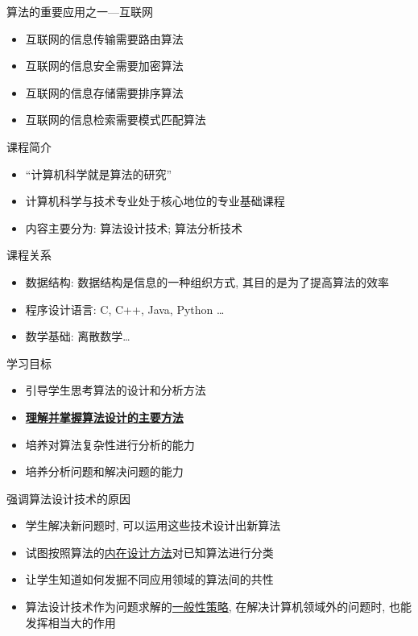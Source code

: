 \documentclass[fontset=fandol,UTF8,12pt,aspectratio=169,fleqn]{beamer}
\begin{document}
\begin{frame}{算法的重要应用之一---互联网}
\begin{itemize}[<+-|alert@+>]
\item 互联网的信息传输需要路由算法  
\item 互联网的信息安全需要加密算法  
\item 互联网的信息存储需要排序算法  
\item 互联网的信息检索需要模式匹配算法  
\end{itemize}
\end{frame}

\begin{frame}{课程简介}
\begin{itemize}[<+-|alert@+>]
\item  ``计算机科学就是算法的研究'' 
\item 计算机科学与技术专业处于核心地位的专业基础课程 
\item 内容主要分为: 算法设计技术; 算法分析技术 
\end{itemize}
\end{frame}

\begin{frame}{课程关系}
\begin{itemize}[<+-|alert@+>]
\item 数据结构: 数据结构是信息的一种组织方式, 其目的是为了提高算法的效率
\item 程序设计语言: C, C++, Java, Python \ldots
\item 数学基础: 离散数学\ldots
\end{itemize}
\end{frame}

\begin{frame}{学习目标}
\begin{itemize}[<+-|alert@+>]
\item 引导学生思考算法的设计和分析方法
\item \underline{\textbf{理解并掌握算法设计的主要方法}}
\item 培养对算法复杂性进行分析的能力
\item 培养分析问题和解决问题的能力
\end{itemize}
\end{frame}

\begin{frame}{强调算法设计技术的原因}
\begin{itemize}[<+-|alert@+>]
\item 学生解决新问题时, 可以运用这些技术设计出新算法  
\item 试图按照算法的\underline{内在设计方法}对已知算法进行分类  
\item 让学生知道如何发掘不同应用领域的算法间的共性  
\item 算法设计技术作为问题求解的\underline{一般性策略}, 在解决计算机领域外的问题时, 也能发挥相当大的作用  
\end{itemize}
\end{frame}
\end{document}
